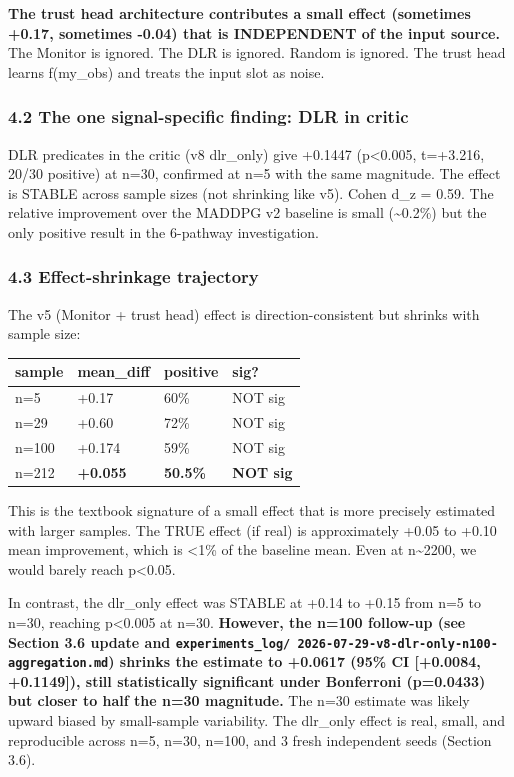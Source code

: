 \documentclass[
]{article}
\newcounter{none} %
\begin{document}
\textbf{The trust head architecture contributes a small effect
(sometimes +0.17, sometimes -0.04) that is INDEPENDENT of the input
source.} The Monitor is ignored. The DLR is ignored. Random is ignored.
The trust head learns f(my\_obs) and treats the input slot as noise.

\subsubsection{4.2 The one signal-specific finding: DLR in
critic}\label{the-one-signal-specific-finding-dlr-in-critic}

DLR predicates in the critic (v8 dlr\_only) give +0.1447
(p\textless0.005, t=+3.216, 20/30 positive) at n=30, confirmed at n=5
with the same magnitude. The effect is STABLE across sample sizes (not
shrinking like v5). Cohen d\_z = 0.59. The relative improvement over the
MADDPG v2 baseline is small (\textasciitilde0.2\%) but the only positive
result in the 6-pathway investigation.

\subsubsection{4.3 Effect-shrinkage
trajectory}\label{effect-shrinkage-trajectory}

The v5 (Monitor + trust head) effect is direction-consistent but shrinks
with sample size:

{\def\LTcaptype{none} %
\begin{longtable}[]{@{}llll@{}}
\toprule\noalign{}
sample & mean\_diff & positive & sig? \\
\midrule\noalign{}
\endhead
\bottomrule\noalign{}
\endlastfoot
n=5 & +0.17 & 60\% & NOT sig \\
n=29 & +0.60 & 72\% & NOT sig \\
n=100 & +0.174 & 59\% & NOT sig \\
n=212 & \textbf{+0.055} & \textbf{50.5\%} & \textbf{NOT sig} \\
\end{longtable}
}

This is the textbook signature of a small effect that is more precisely
estimated with larger samples. The TRUE effect (if real) is
approximately +0.05 to +0.10 mean improvement, which is \textless1\% of
the baseline mean. Even at n\textasciitilde2200, we would barely reach
p\textless0.05.

In contrast, the dlr\_only effect was STABLE at +0.14 to +0.15 from n=5
to n=30, reaching p\textless0.005 at n=30. \textbf{However, the n=100
follow-up (see Section 3.6 update and
\texttt{experiments\_log/\ 2026-07-29-v8-dlr-only-n100-aggregation.md})
shrinks the estimate to +0.0617 (95\% CI {[}+0.0084, +0.1149{]}), still
statistically significant under Bonferroni (p=0.0433) but closer to half
the n=30 magnitude.} The n=30 estimate was likely upward biased by
small-sample variability. The dlr\_only effect is real, small, and
reproducible across n=5, n=30, n=100, and 3 fresh independent seeds
(Section 3.6).
\end{document}
